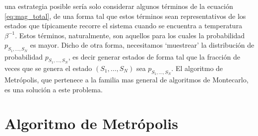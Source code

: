 \documentclass[a4paper,11pt,oneside]{article}
\begin{document}
una estrategia posible sería solo considerar algunos términos de la ecuación
\ref{eq:mag_total}, de una forma tal que estos términos sean representativos
de los estados que típicamente recorre el sistema cuando se encuentra a
temperatura $\beta^{-1}$. Estos términos, naturalmente, son aquellos para los
cuales la probabilidad $p_{S_1,\dots,S_N}$ es mayor.
Dicho de otra forma, necesitamos `muestrear' la
distribución de probabilidad $p_{S_1,\dots,S_N}$, es decir generar estados de
forma tal que la fracción de veces que se genera el estado $(S_1,\dots,S_N)$
sea $p_{S_1,\dots,S_N}$. El algoritmo de Metrópolis, que pertenece a la familia
mas general de algoritmos de Montecarlo, es una solución a este problema.

\section{Algoritmo de Metrópolis}
\end{document}
